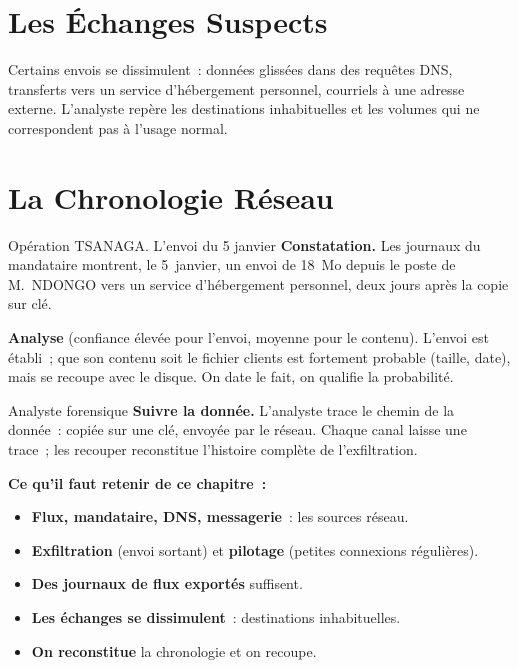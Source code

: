 \section{Les Échanges Suspects}
\label{sec:c13-suspects}

Certains envois se dissimulent~: données glissées dans des requêtes DNS,
transferts vers un service d'hébergement personnel, courriels à une adresse
externe. L'analyste repère les destinations inhabituelles et les volumes qui
ne correspondent pas à l'usage normal.

\section{La Chronologie Réseau}
\label{sec:c13-chrono}

\begin{boxscenario}{Opération TSANAGA. L'envoi du 5 janvier}
\textbf{Constatation.} Les journaux du mandataire montrent, le 5~janvier, un
envoi de 18~Mo depuis le poste de M.~NDONGO vers un service d'hébergement
personnel, deux jours après la copie sur clé.

\medskip
\textbf{Analyse} (confiance élevée pour l'envoi, moyenne pour le contenu).
L'envoi est établi~; que son contenu soit le fichier clients est fortement
probable (taille, date), mais se recoupe avec le disque. On date le fait, on
qualifie la probabilité.
\end{boxscenario}

\begin{boxmetier}{Analyste forensique}
\textbf{Suivre la donnée.} L'analyste trace le chemin de la donnée~: copiée
sur une clé, envoyée par le réseau. Chaque canal laisse une trace~; les
recouper reconstitue l'histoire complète de l'exfiltration.
\end{boxmetier}

\separateur

\begin{boxresume}
\textbf{Ce qu'il faut retenir de ce chapitre~:}
\begin{itemize}
    \item \textbf{Flux, mandataire, DNS, messagerie}~: les sources réseau.
    \item \textbf{Exfiltration} (envoi sortant) et \textbf{pilotage} (petites
          connexions régulières).
    \item \textbf{Des journaux de flux exportés} suffisent.
    \item \textbf{Les échanges se dissimulent}~: destinations inhabituelles.
    \item \textbf{On reconstitue} la chronologie et on recoupe.
\end{itemize}
\end{boxresume}

